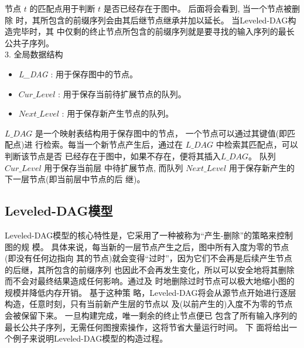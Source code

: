 节点 $t$ 的匹配点用于判断 $t$ 是否已经存在于图中。 后面将会看到, 当一个节点被删除
时，其所包含的前缀序列会由其后继节点继承并加以延长。 当Leveled-DAG构造完毕时，其
中仅剩的终止节点所包含的前缀序列就是要寻找的输入序列的最长公共子序列。\\

3. 全局数据结构
\label{sec:auxiliary}

\begin{itemize}
\item \emph{L\_DAG} : 用于保存图中的节点。
\item $Cur\_Level$ : 用于保存当前待扩展节点的队列。
\item $Next\_Level$ : 用于保存新产生节点的队列。
\end{itemize}



$L\_DAG$ 是一个映射表结构用于保存图中的节点， 一个节点可以通过其键值(即匹配点)进
行检索。每当一个新节点产生后，通过在 $L\_DAG$ 中检索其匹配点，可以判断该节点是否
已经存在于图中，如果不存在，便将其插入$L\_DAG$。 队列 $Cur\_Level$ 用于保存当前层
中待扩展节点, 而队列 $Next\_Level$ 用于保存新产生的下一层节点(即当前层中节点的后
继)。


\subsection{Leveled-DAG模型}
\label{sec:leveled DAG}

Leveled-DAG模型的核心特性是，它采用了一种被称为“产生-删除”的策略来控制图的规
模。 具体来说，每当新的一层节点产生之后，图中所有入度为零的节点(即没有任何边指向
其的节点)就会变得“过时”，因为它们不会再是后续产生节点的后继，其所包含的前缀序列
也因此不会再发生变化，所以可以安全地将其删除而不会对最终结果造成任何影响。通过及
时地删除过时节点可以极大地缩小图的规模并降低内存开销。 基于这种策
略，Leveled-DAG将会从源节点开始进行逐层构造，任意时刻，只有当前新产生层的节点以
及(以前产生的)入度不为零的节点会被保留下来。 一旦构建完成，唯一剩余的终止节点便已
包含了所有输入序列的最长公共子序列，无需任何图搜索操作，这将节省大量运行时间。 下
面将给出一个例子来说明Leveled-DAG模型的构造过程。

